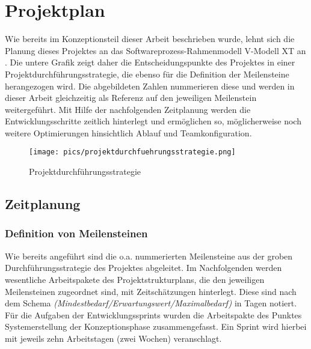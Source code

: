 \chapter{Projektplan}

Wie bereits im Konzeptionsteil dieser Arbeit beschrieben wurde, lehnt sich die Planung dieses Projektes an das Softwareprozess-Rahmenmodell V-Modell XT an \citep{angermeier_v-modell-xt_2024}. Die untere Grafik zeigt daher die Entscheidungspunkte des Projektes in einer Projektdurchführungsstrategie, die ebenso für die Definition der Meilensteine herangezogen wird. Die abgebildeten Zahlen nummerieren diese und werden in dieser Arbeit gleichzeitig als Referenz auf den jeweiligen Meilenstein weitergeführt. Mit Hilfe der nachfolgenden Zeitplanung werden die Entwicklungsschritte zeitlich hinterlegt und ermöglichen so, möglicherweise noch weitere Optimierungen hinsichtlich Ablauf und Teamkonfiguration.

\begin{figure}[h]
\centering
\texttt{[image: pics/projektdurchfuehrungsstrategie.png]}
\caption{Projektdurchführungsstrategie} 
\label{fig:strategy}
\end{figure}

\FloatBarrier

\section{Zeitplanung}

\subsection{Definition von Meilensteinen}

Wie bereits angeführt sind die o.a. nummerierten Meilensteine aus der groben Durchführungsstrategie des Projektes abgeleitet. Im Nachfolgenden werden wesentliche Arbeitspakete des Projektstrukturplans, die den jeweiligen Meilensteinen zugeordnet sind, mit Zeitschätzungen hinterlegt. Diese sind nach dem Schema \textit{(Mindestbedarf/Erwartungswert/Maximalbedarf)} in Tagen notiert. Für die Aufgaben der Entwicklungssprints wurden die Arbeitspakte des Punktes Systemerstellung der Konzeptionsphase zusammengefasst. Ein Sprint wird hierbei mit jeweils zehn Arbeitstagen (zwei Wochen) veranschlagt.

